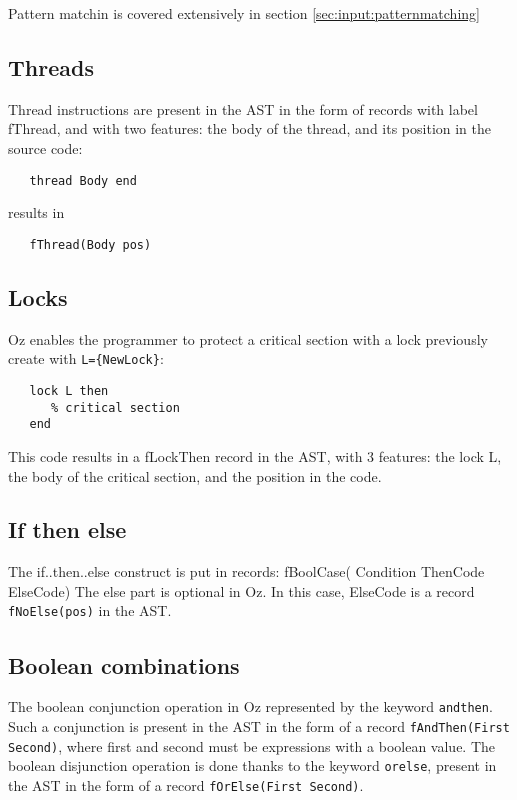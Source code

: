 \documentclass[a4paper]{memoir}
\begin{document}
Pattern matchin is covered extensively in section \ref{sec:input:patternmatching}

\subsection{Threads}
Thread instructions are present in the AST in the form of records with label fThread, and with two features: the body of the thread, and its position in the source code:
\begin{lstlisting}
   thread Body end
\end{lstlisting}
results in
\begin{lstlisting}
   fThread(Body pos)
\end{lstlisting}
\subsection{Locks}
Oz enables the programmer to protect a critical section with a lock previously create with \lstinline!L={NewLock}!:
\begin{lstlisting}
   lock L then
      % critical section
   end
\end{lstlisting}

This code results in a fLockThen record in the AST, with 3 features: the lock L, the body of the critical section, and the position in the code.
\subsection{If then else}
The if..then..else construct is put in records:
fBoolCase( Condition ThenCode ElseCode)
The else part is optional in Oz. In this case, ElseCode is a record \lstinline!fNoElse(pos)! in the AST.
\subsection{Boolean combinations}\label{sec:input:booleancombinations}
The boolean conjunction operation in Oz represented by the keyword \lstinline!andthen!. Such a conjunction is present in the AST in the form of a record \lstinline!fAndThen(First Second)!, where first and second must be expressions with a boolean value.
The boolean disjunction operation is done thanks to the keyword \lstinline!orelse!, present in the AST in the form of a record \lstinline!fOrElse(First Second)!.
\end{document}
